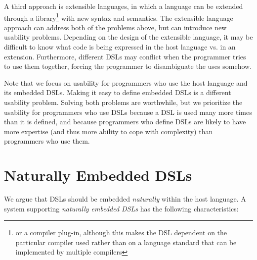 \documentclass[preprint]{sigplanconf}
\begin{document}
A third approach is extensible languages, in which a language
can be extended through a library\footnote{or a compiler plug-in,
although this makes the DSL dependent on the particular compiler
used rather than on a language standard that can be implemented
by multiple compilers} with new syntax and semantics.  The
extensible language approach can address both of the problems above,
but can introduce new usability problems.  Depending on the
design of the extensible language, it may be difficult to know
what code is being expressed in the host language vs. in an
extension.  Furthermore, different DSLs may conflict when the
programmer tries to use them together, forcing the programmer
to disambiguate the uses somehow.

Note that we focus on usability for programmers who use the host
language and its embedded DSLs.  Making it easy to define embedded
DSLs is a different usability problem.  Solving both problems are
worthwhile, but we prioritize the usability for programmers who
use DSLs because a DSL is used many more times than it is defined,
and because programmers who define DSLs are likely to have more
expertise (and thus more ability to cope with complexity) than
programmers who use them.

\section{Naturally Embedded DSLs}

We argue that DSLs should be embedded \textit{naturally} within the
host language.  A system supporting \textit{naturally embedded DSLs}
has the following characteristics:
\end{document}
